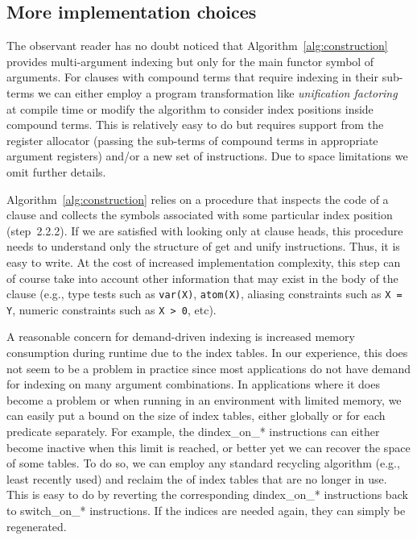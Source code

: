 \documentclass{llncs}
\newcommand{\code}[1]{\texttt{#1}}
\newcommand{\instr}[1]{\textsf{#1}}
\newcommand{\jitiSTAR}{\mbox{\instr{dindex\_on\_*}}\xspace}
\newcommand{\switchSTAR}{\mbox{\instr{switch\_on\_*}}\xspace}
\newcommand{\JITI}{demand-driven indexing\xspace}
\begin{document}
\subsection{More implementation choices}
The observant reader has no doubt noticed that
Algorithm~\ref{alg:construction} provides multi-argument indexing but
only for the main functor symbol of arguments. For clauses with
compound terms that require indexing in their sub-terms we can either
employ a program transformation like \emph{unification
factoring}~\cite{UnifFact@POPL-95} at compile time or modify the
algorithm to consider index positions inside compound terms. This is
relatively easy to do but requires support from the register allocator
(passing the sub-terms of compound terms in appropriate argument
registers) and/or a new set of instructions. Due to space limitations
we omit further details.

Algorithm~\ref{alg:construction} relies on a procedure that inspects
the code of a clause and collects the symbols associated with some
particular index position (step~2.2.2). If we are satisfied with
looking only at clause heads, this procedure needs to understand only
the structure of \instr{get} and \instr{unify} instructions. Thus, it
is easy to write. At the cost of increased implementation complexity,
this step can of course take into account other information that may
exist in the body of the clause (e.g., type tests such as
\code{var(X)}, \code{atom(X)}, aliasing constraints such as \code{X =
Y}, numeric constraints such as \code{X > 0}, etc).

A reasonable concern for \JITI is increased memory consumption during
runtime due to the index tables. In our experience, this does not seem
to be a problem in practice since most applications do not have demand
for indexing on many argument combinations. In applications where it
does become a problem or when running in an environment with limited
memory, we can easily put a bound on the size of index tables, either
globally or for each predicate separately. For example, the \jitiSTAR
instructions can either become inactive when this limit is reached, or
better yet we can recover the space of some tables. To do so, we can
employ any standard recycling algorithm (e.g., least recently used)
and reclaim the of index tables that are no longer in use. This is
easy to do by reverting the corresponding \jitiSTAR instructions back
to \switchSTAR instructions. If the indices are needed again, they can
simply be regenerated.
\end{document}
